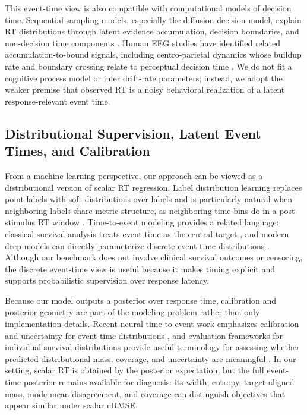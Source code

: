 \documentclass[12pt]{article}
\begin{document}
This event-time view is also compatible with computational models of decision time.
Sequential-sampling models, especially the diffusion decision model, explain RT
distributions through latent evidence accumulation, decision boundaries, and
non-decision time components \citep{Ratcliff2008Diffusion}. Human EEG studies have
identified related accumulation-to-bound signals, including centro-parietal dynamics
whose buildup rate and boundary crossing relate to perceptual decision time
\citep{OConnell2012Supramodal,Kelly2013Internal}. We do not fit a cognitive process
model or infer drift-rate parameters; instead, we adopt the weaker premise that observed
RT is a noisy behavioral realization of a latent response-relevant event time.

\subsection{Distributional Supervision, Latent Event Times, and Calibration}
From a machine-learning perspective, our approach can be viewed as a distributional
version of scalar RT regression. Label distribution learning replaces point labels with
soft distributions over labels and is particularly natural when neighboring labels share
metric structure, as neighboring time bins do in a post-stimulus RT window
\citep{Geng2016LabelDistributionLearning}. Time-to-event modeling provides a related
language: classical survival analysis treats event time as the central target
\citep{Cox1972CoxPH}, and modern deep models can directly parameterize discrete
event-time distributions \citep{Lee2018DeepHit}. Although our benchmark does not
involve clinical survival outcomes or censoring, the discrete event-time view is useful
because it makes timing explicit and supports probabilistic supervision over response
latency.

Because our model outputs a posterior over response time, calibration and posterior
geometry are part of the modeling problem rather than only implementation details.
Recent neural time-to-event work emphasizes calibration and uncertainty for
event-time distributions \citep{Chapfuwa2023Calibration}, and evaluation frameworks
for individual survival distributions provide useful terminology for assessing whether
predicted distributional mass, coverage, and uncertainty are meaningful
\citep{Haider2020SurvivalDistributions}. In our setting, scalar RT is obtained by the
posterior expectation, but the full event-time posterior remains available for diagnosis:
its width, entropy, target-aligned mass, mode-mean disagreement, and coverage can
distinguish objectives that appear similar under scalar nRMSE.
\end{document}
